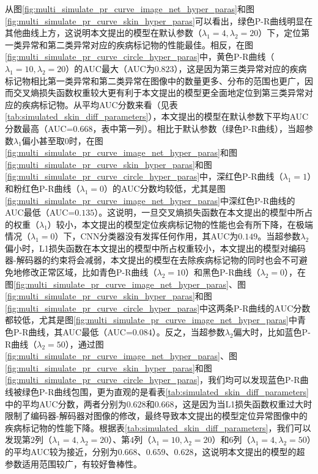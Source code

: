 从图\ref{fig:multi_simulate_pr_curve_image_net_hyper_paras}和图\ref{fig:multi_simulate_pr_curve_skin_hyper_paras}可以看出，绿色P-R曲线明显在其他曲线上方，这说明本文提出的模型在默认参数（$\lambda_{1}=4,\lambda_{2}=20$）下，定位第一类异常和第二类异常对应的疾病标记物的性能最佳。相反，在图\ref{fig:multi_simulate_pr_curve_circle_hyper_paras}中，黄色P-R曲线（$\lambda_{1}=10,\lambda_{2}=20$）的AUC最大（AUC为$0.823$），这是因为第三类异常对应的疾病标记物相比第一类异常和第二类异常在图像中的数量更多、分布的范围也更广，因而交叉熵损失函数权重较大更有利于本文提出的模型更全面地定位到第三类异常对应的疾病标记物。从平均AUC分数来看（见表\ref{tab:simulated_skin_diff_parameters}），本文提出的模型在默认参数下平均AUC分数最高（AUC=$0.668$，表中第一列）。相比于默认参数（绿色P-R曲线），当超参数$\lambda_{1}$偏小甚至取$0$时，在图\ref{fig:multi_simulate_pr_curve_image_net_hyper_paras}和图\ref{fig:multi_simulate_pr_curve_skin_hyper_paras}和图\ref{fig:multi_simulate_pr_curve_circle_hyper_paras}中，深红色P-R曲线（$\lambda_{1}=1$）和粉红色P-R曲线（$\lambda_{1}=0$）的AUC分数均较低，尤其是图\ref{fig:multi_simulate_pr_curve_image_net_hyper_paras}中深红色P-R曲线的AUC最低（AUC=$0.135$）。这说明，一旦交叉熵损失函数在本文提出的模型中所占的权重（$\lambda_{1}$）较小，本文提出的模型定位疾病标记物的性能也会有所下降，在极端情况（$\lambda_{1}=0$）下，CNN分类器没有发挥任何作用，其AUC为$0.149$。当超参数$\lambda_{2}$偏小时，L1损失函数在本文提出的模型中所占权重较小，本文提出的模型对编码器-解码器的约束将会减弱，本文提出的模型在去除疾病标记物的同时也会不可避免地修改正常区域，比如青色P-R曲线（$\lambda_{2}=10$）和黑色P-R曲线（$\lambda_2=0$），在图\ref{fig:multi_simulate_pr_curve_image_net_hyper_paras}、图\ref{fig:multi_simulate_pr_curve_skin_hyper_paras}和图\ref{fig:multi_simulate_pr_curve_circle_hyper_paras}中这两条P-R曲线的AUC分数都较低，尤其是图\ref{fig:multi_simulate_pr_curve_image_net_hyper_paras}中青色P-R曲线，其AUC最低（AUC=$0.084$）。反之，当超参数$\lambda_{2}$偏大时，比如蓝色P-R曲线（$\lambda_{2}=50$），通过图\ref{fig:multi_simulate_pr_curve_image_net_hyper_paras}、图\ref{fig:multi_simulate_pr_curve_skin_hyper_paras}和图\ref{fig:multi_simulate_pr_curve_circle_hyper_paras}，我们均可以发现蓝色P-R曲线被绿色P-R曲线包围，更为直观的是看表\ref{tab:simulated_skin_diff_parameters}中的平均AUC分数，两者分别为$0.628$和$0.668$，这是因为当L1损失函数权重过大时限制了编码器-解码器对图像的修改，最终导致本文提出的模型定位异常图像中的疾病标记物的性能下降。根据表\ref{tab:simulated_skin_diff_parameters}，我们可以发现第$2$列（$\lambda_{1}=4,\lambda_{2}=20$）、第$4$列（$\lambda_{1}=10,\lambda_{2}=20$）和$6$列（$\lambda_{1}=4,\lambda_{2}=50$）的平均AUC较为接近，分别为$0.668$、$0.659$、$0.628$，这说明本文提出的模型的超参数适用范围较广，有较好鲁棒性。


